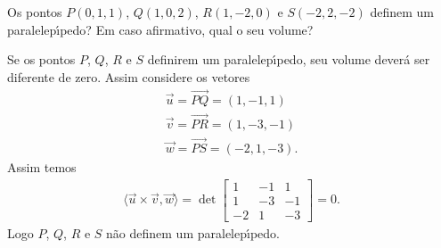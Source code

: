 \begin{exemplo}
  Os pontos $P(0,1,1)$, $Q(1,0,2)$, $R(1,-2,0)$ e $S(-2,2,-2)$ definem um paralelep{\'\i}pedo? Em caso afirmativo, qual o seu volume?
  \begin{solucao}
    Se os pontos $P$, $Q$, $R$ e $S$ definirem um paralelep{\'\i}pedo, seu volume dever\'a ser diferente de zero. Assim considere os vetores
    \begin{align*}
      \vec{u} = \vec{PQ} = (1,-1,1)\\
      \vec{v} = \vec{PR} = (1,-3,-1)\\
      \vec{w} = \vec{PS} = (-2,1,-3).
    \end{align*}
    Assim temos
    \begin{align*}
      \langle\vec{u}\times\vec{v}, \vec{w}\rangle = \det \begin{bmatrix}
        1 & -1 & 1\\
        1 & -3 & -1\\
        -2 & 1 & -3
      \end{bmatrix} = 0.
    \end{align*}
    Logo $P$, $Q$, $R$ e $S$ n\~ao definem um paralelep{\'\i}pedo.
  \end{solucao}
\end{exemplo}

